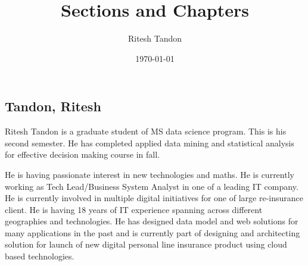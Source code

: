 \documentclass{article}
\title{Sections and Chapters}
\author{Ritesh Tandon}
\date{\today}
\begin{document}
	
\subsection{Tandon, Ritesh}
	
Ritesh Tandon is a graduate student of MS data science program. This is his second semester. He has completed applied data mining and statistical analysis for effective decision making course in fall.
	
He is having passionate interest in new technologies and maths. He is currently working as Tech Lead/Business System Analyst in one of a leading IT company. He is currently involved in multiple digital initiatives for one of large re-insurance client. He is having 18 years of IT experience spanning across different geographies and technologies. He has designed data model and web solutions for many applications in the past and is currently part of designing and architecting solution for launch of new digital personal line insurance product using cloud based technologies.
	
\end{document}
